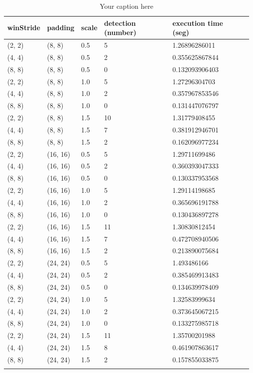 \begin{longtable}{|l|l|l|l|l|l|} 
	\hline
	\textbf{winStride} & \textbf{padding} & \textbf{scale} & \textbf{detection (number)} & \textbf{execution time (seg)} \\ \hline
	(2, 2) & (8, 8) & 0.5 & 5 & 1.26896286011 \\ \hline
	(4, 4) & (8, 8) & 0.5 & 2 & 0.355625867844 \\ \hline
	(8, 8) & (8, 8) & 0.5 & 0 & 0.132093906403 \\ \hline
	(2, 2) & (8, 8) & 1.0 & 5 & 1.27296304703 \\ \hline
	(4, 4) & (8, 8) & 1.0 & 2 & 0.357967853546 \\ \hline
	(8, 8) & (8, 8) & 1.0 & 0 & 0.131447076797 \\ \hline
	(2, 2) & (8, 8) & 1.5 & 10 & 1.31779408455 \\ \hline
	(4, 4) & (8, 8) & 1.5 & 7 & 0.381912946701 \\ \hline
	(8, 8) & (8, 8) & 1.5 & 2 & 0.162096977234 \\ \hline
	(2, 2) & (16, 16) & 0.5 & 5 & 1.29711699486 \\ \hline
	(4, 4) & (16, 16) & 0.5 & 2 & 0.360393047333 \\ \hline
	(8, 8) & (16, 16) & 0.5 & 0 & 0.130337953568 \\ \hline
	(2, 2) & (16, 16) & 1.0 & 5 & 1.29114198685 \\ \hline
	(4, 4) & (16, 16) & 1.0 & 2 & 0.365696191788 \\ \hline
	(8, 8) & (16, 16) & 1.0 & 0 & 0.130436897278 \\ \hline
	(2, 2) & (16, 16) & 1.5 & 11 & 1.30830812454 \\ \hline
	(4, 4) & (16, 16) & 1.5 & 7 & 0.472708940506 \\ \hline
	(8, 8) & (16, 16) & 1.5 & 2 & 0.213890075684 \\ \hline
	(2, 2) & (24, 24) & 0.5 & 5 & 1.493486166 \\ \hline
	(4, 4) & (24, 24) & 0.5 & 2 & 0.385469913483 \\ \hline
	(8, 8) & (24, 24) & 0.5 & 0 & 0.134639978409 \\ \hline
	(2, 2) & (24, 24) & 1.0 & 5 & 1.32583999634 \\ \hline
	(4, 4) & (24, 24) & 1.0 & 2 & 0.373645067215 \\ \hline
	(8, 8) & (24, 24) & 1.0 & 0 & 0.133275985718 \\ \hline
	(2, 2) & (24, 24) & 1.5 & 11 & 1.35700201988 \\ \hline
	(4, 4) & (24, 24) & 1.5 & 8 & 0.461907863617 \\ \hline
	(8, 8) & (24, 24) & 1.5 & 2 & 0.157855033875 \\ \hline
	


	\caption{Your caption here} %
	\label{tab:myfirstlongtable}
\end{longtable}



